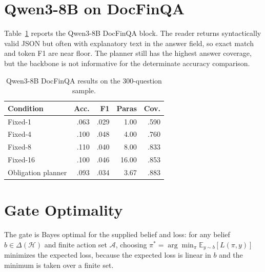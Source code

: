\documentclass[11pt]{article}
\begin{document}
\section{Qwen3-8B on DocFinQA}
\label{app:qwen}
Table~\ref{tab:qwendoc} reports the Qwen3-8B DocFinQA block. The reader returns syntactically valid JSON but often with explanatory text in the answer field, so exact match and token F1 are near floor. The planner still has the highest answer coverage, but the backbone is not informative for the determinate accuracy comparison.

\begin{table}[t]
\centering
\small
\setlength{\tabcolsep}{3pt}
\caption{Qwen3-8B DocFinQA results on the 300-question sample.}
\label{tab:qwendoc}
\begin{tabular}{lrrrr}
\toprule
Condition & Acc. & F1 & Paras & Cov. \\
\midrule
Fixed-1 & .063 & .029 & 1.00 & .590 \\
Fixed-4 & .100 & .048 & 4.00 & .760 \\
Fixed-8 & .110 & .040 & 8.00 & .833 \\
Fixed-16 & .100 & .046 & 16.00 & .853 \\
Obligation planner & .093 & .034 & 3.67 & .883 \\
\bottomrule
\end{tabular}
\end{table}

\section{Gate Optimality}
The gate is Bayes optimal for the supplied belief and loss: for any belief $b\in\Delta(\mathcal H)$ and finite action set $\mathcal A$, choosing $\pi^*=\arg\min_{\pi}\mathbb E_{y\sim b}[L(\pi,y)]$ minimizes the expected loss, because the expected loss is linear in $b$ and the minimum is taken over a finite set.
\end{document}
